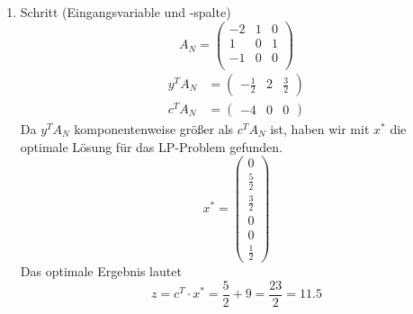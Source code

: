 \documentclass[a4paper]{scrartcl}
\begin{document}
\begin{enumerate}[label=\bfseries\arabic*.]
\begin{enumerate}
\begin{enumerate}[1.]
\begin{enumerate}[1.]
                            \item Schritt (Eingangsvariable und -spalte)
                                \begin{equation}
                                    A_N =
                                    \begin{pmatrix}
                                        -2 & 1 &  0 \\
                                         1 & 0 &  1 \\
                                        -1 & 0 &  0 \\
                                    \end{pmatrix}
                                \end{equation}
                                \begin{align}
                                    y^TA_N &=
                                    \begin{pmatrix}
                                        -\frac{1}{2} & 2 & \frac{3}{2}
                                    \end{pmatrix} \\
                                    c^TA_N &=
                                    \begin{pmatrix}
                                        -4 & 0 & 0
                                    \end{pmatrix}
                                \end{align}
                                Da $y^TA_N$ komponentenweise größer als $c^TA_N$
                                ist, haben wir mit $x^*$ die optimale Lösung für
                                das LP-Problem gefunden.
                                \begin{equation}
                                    x^* =
                                    \begin{pmatrix}
                                        0 \\ \frac{5}{2} \\ \frac{3}{2} \\ 0 \\ 0 \\ \frac{1}{2}
                                    \end{pmatrix}
                                \end{equation}
                                Das optimale Ergebnis lautet
                                \begin{equation}
                                    z = c^T \cdot x^* = \frac{5}{2} + 9 = \frac{23}{2} = 11.5
                                \end{equation}


\end{enumerate}
\end{enumerate}
\end{enumerate}
\end{enumerate}
\end{document}
